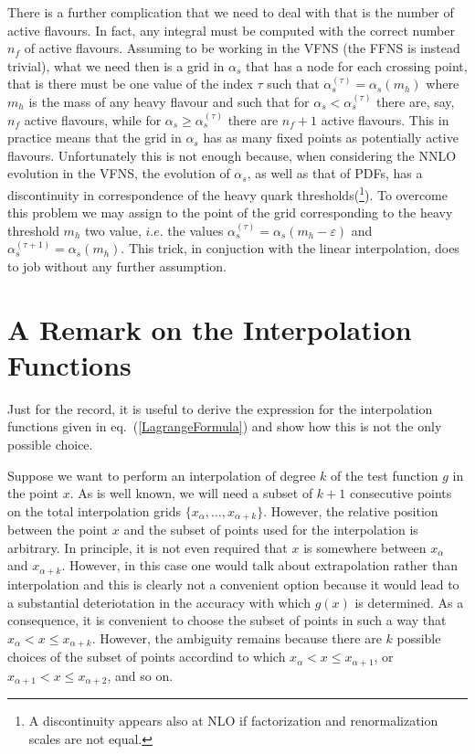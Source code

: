 \documentclass[10pt,a4paper]{article}
\begin{document}
There is a further complication that we need to deal with that is the
number of active flavours. In fact, any integral must be computed with
the correct number $n_f$ of active flavours. Assuming to be working
in the VFNS (the FFNS is instead trivial), what we need then is a grid in $\alpha_s$ that has a node
for each crossing point, that is there must be one value of the index
$\tau$ such that $\alpha_s^{(\tau)}=\alpha_s(m_h)$ where $m_h$ is the
mass of any heavy flavour and such that for $\alpha_s<\alpha_s^{(\tau)}$
there are, say, $n_f$ active flavours, while for
$\alpha_s\geq\alpha_s^{(\tau)}$ there are $n_f+1$ active flavours. This in practice means that the grid in
$\alpha_s$ has as many fixed points as potentially active
flavours. Unfortunately this is not enough because, when considering
the NNLO evolution in the VFNS, the evolution of $\alpha_s$, as well as
that of PDFs, has a discontinuity in correspondence of the heavy quark
thresholds(\footnote{A discontinuity appears also at NLO if
  factorization and renormalization scales are not equal.}). To
overcome this problem we may assign to the point of the grid
corresponding to the heavy threshold $m_h$ two value, $i.e.$ the
values $\alpha_s^{(\tau)}=\alpha_s(m_h-\varepsilon)$ and
$\alpha_s^{(\tau+1)}=\alpha_s(m_h)$. This trick, in conjuction with
the linear interpolation, does to job without any further assumption.

\appendix

\section{A Remark on the Interpolation Functions}

Just for the record, it is useful to derive the expression for the
interpolation functions given in eq.~(\ref{LagrangeFormula}) and show
how this is not the only possible choice.

Suppose we want to perform an interpolation of degree $k$ of the test
function $g$ in the point $x$. As is well known, we will need a
subset of $k+1$ consecutive points on the total interpolation grids
$\{x_{\alpha},\dots,x_{\alpha+k}\}$. However, the relative position
between the point $x$ and the subset of points used for the
interpolation is arbitrary. In principle, it is not even required that
$x$ is somewhere between $x_\alpha$ and $x_{\alpha+k}$. However, in
this case one would talk about extrapolation rather than interpolation
and this is clearly not a convenient option because it would lead to a
substantial deteriotation in the accuracy with which $g(x)$ is
determined. As a consequence, it is convenient to choose the subset of
points in such a way that $x_\alpha < x \leq x_{\alpha+k}$. However,
the ambiguity remains because there are $k$ possible choices of the
subset of points accordind to which $x_\alpha < x \leq x_{\alpha+1}$,
or $x_{\alpha+1} < x \leq x_{\alpha+2}$, and so on.
\end{document}
